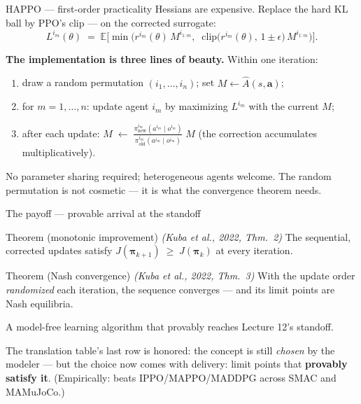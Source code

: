 \documentclass[10pt, aspectratio=169]{beamer}
\newcommand{\paper}[1]{\textcolor{mLightBrown}{\small\textit{(#1)}}}
\begin{document}
\begin{frame}{HAPPO --- first-order practicality}
Hessians are expensive. Replace the hard KL ball by PPO's clip --- on the \alert{corrected} surrogate:
\[
L^{i_m}(\theta) \;=\; \mathbb{E}\Big[ \min\!\Big( r^{i_m}(\theta)\, M^{i_{1:m}},\;\; \mathrm{clip}\big(r^{i_m}(\theta),\, 1\pm\epsilon\big)\, M^{i_{1:m}} \Big) \Big].
\]
\medskip

\pause
\textbf{The implementation is three lines of beauty.} Within one iteration:
\begin{enumerate}\setlength\itemsep{2pt}
\item draw a random permutation $(i_1,\dots,i_n)$; \quad set $M \leftarrow \hat A(s,\mathbf{a})$;
\item for $m = 1,\dots,n$: \; update agent $i_m$ by maximizing $L^{i_m}$ with the current $M$;
\item after each update: \; $\displaystyle M \;\leftarrow\; \frac{\pi^{i_m}_{\text{new}}(a^{i_m}\mid o^{i_m})}{\pi^{i_m}_{\text{old}}(a^{i_m}\mid o^{i_m})}\; M$ \quad (the correction \alert{accumulates multiplicatively}).
\end{enumerate}
\medskip
\pause
{\footnotesize No parameter sharing required; heterogeneous agents welcome. The random permutation is not cosmetic --- it is what the convergence theorem needs.}
\end{frame}

\begin{frame}{The payoff --- provable arrival at the standoff}
\begin{block}{Theorem (monotonic improvement) \hfill {\scriptsize\normalfont\paper{Kuba et al., 2022, Thm.\ 2}}}
\centering
The sequential, corrected updates satisfy \; $J(\bm\pi_{k+1}) \;\ge\; J(\bm\pi_k)$ \; at every iteration.
\end{block}
\smallskip
\begin{block}{Theorem (Nash convergence) \hfill {\scriptsize\normalfont\paper{Kuba et al., 2022, Thm.\ 3}}}
\centering
With the update order \emph{randomized} each iteration, the sequence converges --- and its limit points are \alert{Nash equilibria}.
\end{block}
\medskip

\pause
\begin{center}\large
A \alert{model-free learning algorithm} that \alert{provably reaches Lecture 12's standoff}.
\end{center}
\medskip
\pause
The translation table's last row is honored: the concept is still \emph{chosen} by the modeler --- but the choice now comes with \alert{delivery}: limit points that \textbf{provably satisfy it}. \; {\footnotesize(Empirically: beats IPPO/MAPPO/MADDPG across SMAC and MAMuJoCo.)}
\end{frame}
\end{document}
